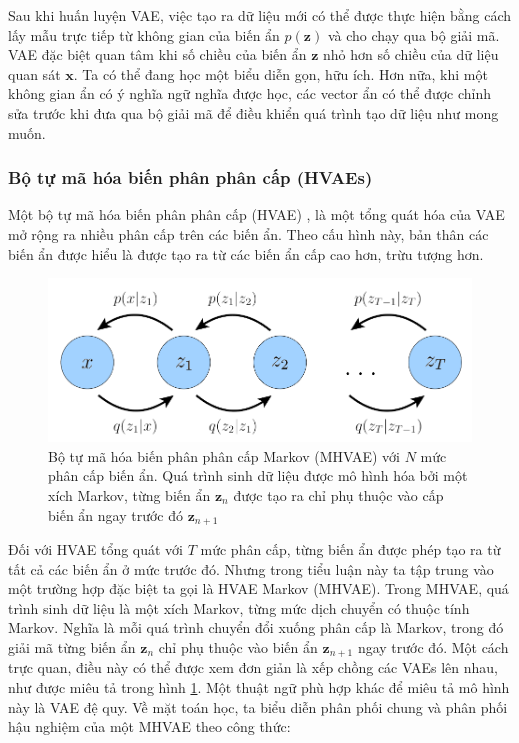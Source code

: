 \documentclass[14pt, a4paper]{article}
\numberwithin{equation}{section}
\numberwithin{figure}{section}
\numberwithin{dl}{section}
\numberwithin{md}{section}
\numberwithin{bd}{section}
\numberwithin{dn}{section}
\numberwithin{hq}{section}
\begin{document}
    Sau khi huấn luyện VAE, việc tạo ra dữ liệu mới có thể được thực hiện bằng cách lấy mẫu trực tiếp từ không gian của biến ẩn $p(\boldsymbol{z})$ và cho chạy qua bộ giải mã.
    VAE đặc biệt quan tâm khi số chiều của biến ẩn $\boldsymbol{z}$ nhỏ hơn số chiều của dữ liệu quan sát $\boldsymbol{x}$.
    Ta có thể đang học một biểu diễn gọn, hữu ích.
    Hơn nữa, khi một không gian ẩn có ý nghĩa ngữ nghĩa được học, các vector ẩn có thể được chỉnh sửa trước khi đưa qua bộ giải mã để điều khiển quá trình tạo dữ liệu như mong muốn.

    \subsubsection{Bộ tự mã hóa biến phân phân cấp (HVAEs)}

    Một bộ tự mã hóa biến phân phân cấp (HVAE) \cite{kingma2016improved}, \cite{sonderby2016ladder} là một tổng quát hóa của VAE mở rộng ra nhiều phân cấp trên các biến ẩn.
    Theo cấu hình này, bản thân các biến ẩn được hiểu là được tạo ra từ các biến ẩn cấp cao hơn, trừu tượng hơn.


    \begin{figure}[h!]
        \centering
        \includegraphics[scale=0.5]{HVAE-Graph.png}
        \caption{Bộ tự mã hóa biến phân phân cấp Markov (MHVAE) với $N$ mức phân cấp biến ẩn.
        Quá trình sinh dữ liệu được mô hình hóa bởi một xích Markov, từng biến ẩn $\boldsymbol{z}_n$ được tạo ra chỉ phụ thuộc vào cấp biến ẩn ngay trước đó $\boldsymbol{z}_{n+1}$}
        \label{fig:HVAE-Graph}
    \end{figure}


    Đối với HVAE tổng quát với $T$ mức phân cấp, từng biến ẩn được phép tạo ra từ tất cả các biến ẩn ở mức trước đó.
    Nhưng trong tiểu luận này ta tập trung vào một trường hợp đặc biệt ta gọi là HVAE Markov (MHVAE).
    Trong MHVAE, quá trình sinh dữ liệu là một xích Markov, từng mức dịch chuyển có thuộc tính Markov.
    Nghĩa là mỗi quá trình chuyển đổi xuống phân cấp là Markov, trong đó giải mã từng biến ẩn $\boldsymbol{z}_n$ chỉ phụ thuộc vào biến ẩn $\boldsymbol{z}_{n+1}$ ngay trước đó.
    Một cách trực quan, điều này có thể được xem đơn giản là xếp chồng các VAEs lên nhau, như được miêu tả trong hình \ref{fig:HVAE-Graph}.
    Một thuật ngữ phù hợp khác để miêu tả mô hình này là VAE đệ quy.
    Về mặt toán học, ta biểu diễn phân phối chung và phân phối hậu nghiệm của một MHVAE theo công thức:
\end{document}

